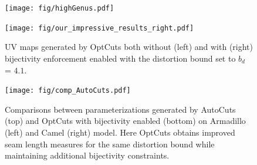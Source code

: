 \begin{figure}[t]
\centering
\texttt{[image: fig/highGenus.pdf]}
\vspace{-0.6cm}
\caption{}
\vspace{-0.1cm}
\label{fig:highGenus}
\end{figure}




%
\begin{figure}[t]
\centering
\texttt{[image: fig/our\_impressive\_results\_right.pdf]}
\vspace{-0.3cm}
\caption{UV maps generated by OptCuts both without (left) and with (right) bijectivity enforcement enabled with the distortion bound set to $b_d$ = $4.1$.}
\vspace{-0.3cm}
\label{fig:our_impressive_results}
\end{figure}


\begin{figure}[tb]
\centering
\texttt{[image: fig/comp\_AutoCuts.pdf]}
\vspace{-0.3cm}
\caption{\old{[updated]}Comparisons between parameterizations generated by AutoCuts (top) and OptCuts with bijectivity enabled (bottom) on Armadillo (left) and Camel (right) model. Here OptCuts obtains improved  seam length measures for the same distortion bound while maintaining additional bijectivity constraints.}
\vspace{-0.3cm}
\label{fig:comp_AutoCuts}
\end{figure}



